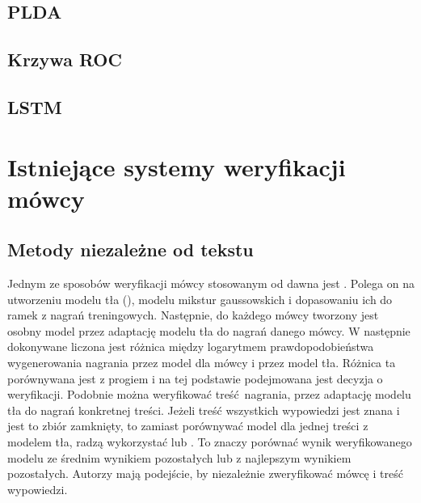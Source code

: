 \subsection{PLDA}


\subsection{Krzywa ROC}




\subsection{LSTM}

\section{Istniejące systemy weryfikacji mówcy}\label{sec:istniejace_systemy}

\subsection{Metody niezależne od tekstu}

Jednym ze sposobów weryfikacji mówcy stosowanym od dawna jest . Polega on na utworzeniu modelu tła
(), modelu mikstur gaussowskich i dopasowaniu ich do ramek  z nagrań
treningowych. Następnie, do każdego mówcy tworzony jest osobny model przez  adaptację modelu tła do nagrań danego
mówcy. W 
następnie dokonywane liczona jest różnica między logarytmem prawdopodobieństwa wygenerowania nagrania przez model
dla mówcy i przez model tła. Różnica ta porównywana jest z progiem i na tej podstawie podejmowana jest decyzja
o weryfikacji. Podobnie można weryfikować treść nagrania, przez adaptację modelu tła do nagrań konkretnej treści.
Jeżeli treść wszystkich wypowiedzi jest znana i jest to zbiór zamknięty, to zamiast porównywać model dla jednej 
treści z modelem tła, radzą wykorzystać  lub . To znaczy porównać wynik weryfikowanego
modelu ze średnim wynikiem pozostałych lub z najlepszym wynikiem pozostałych. Autorzy mają podejście, by niezależnie
zweryfikować mówcę i treść wypowiedzi.

